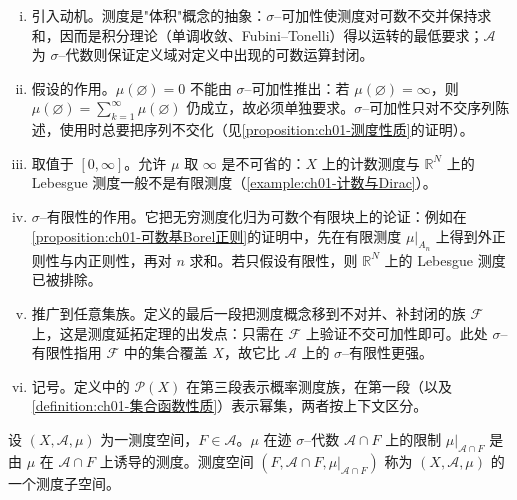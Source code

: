 \documentclass[../../main.tex]{subfiles}%
\begin{document}
\begin{remark}\label{remark:ch01-测度动机}
\begin{enumerate}[(i)]
\item 引入动机。测度是"体积"概念的抽象：$\sigma$--可加性使测度对可数不交并保持求和，因而是积分理论（单调收敛、Fubini--Tonelli）得以运转的最低要求；$\mathcal{A}$ 为 $\sigma$--代数则保证定义域对定义中出现的可数运算封闭。
\item 假设的作用。$\mu(\varnothing )=0$ 不能由 $\sigma$--可加性推出：若 $\mu(\varnothing )=\infty$，则 $\mu(\varnothing )=\sum_{k=1}^\infty\mu(\varnothing )$ 仍成立，故必须单独要求。$\sigma$--可加性只对不交序列陈述，使用时总要把序列不交化（见\cref{proposition:ch01-测度性质}的证明）。
\item 取值于 $[0,\infty]$。允许 $\mu$ 取 $\infty$ 是不可省的：$X$ 上的计数测度与 $\mathbb{R}^N$ 上的 Lebesgue 测度一般不是有限测度（\cref{example:ch01-计数与Dirac}）。
\item $\sigma$--有限性的作用。它把无穷测度化归为可数个有限块上的论证：例如在\cref{proposition:ch01-可数基Borel正则}的证明中，先在有限测度 $\mu|_{A_n}$ 上得到外正则性与内正则性，再对 $n$ 求和。若只假设有限性，则 $\mathbb{R}^N$ 上的 Lebesgue 测度已被排除。
\item 推广到任意集族。定义的最后一段把测度概念移到不对并、补封闭的族 $\mathcal{F}$ 上，这是测度延拓定理的出发点：只需在 $\mathcal{F}$ 上验证不交可加性即可。此处 $\sigma$--有限性指用 $\mathcal{F}$ 中的集合覆盖 $X$，故它比 $\mathcal{A}$ 上的 $\sigma$--有限性更强。
\item 记号。定义中的 $\mathcal{P}(X)$ 在第三段表示概率测度族，在第一段（以及\cref{definition:ch01-集合函数性质}）表示幂集，两者按上下文区分。
\end{enumerate}
\end{remark}

\begin{remark}\label{remark:ch01-测度子空间}
设 $(X,\mathcal{A},\mu)$ 为一测度空间，$F\in\mathcal{A}$。$\mu$ 在迹 $\sigma$--代数 $\mathcal{A}\cap F$ 上的限制 $\mu|_{\mathcal{A}\cap F}$ 是由 $\mu$ 在 $\mathcal{A}\cap F$ 上诱导的测度。测度空间 $(F,\mathcal{A}\cap F,\mu|_{\mathcal{A}\cap F})$ 称为 $(X,\mathcal{A},\mu)$ 的一个测度子空间。
\end{remark}
\end{document}
